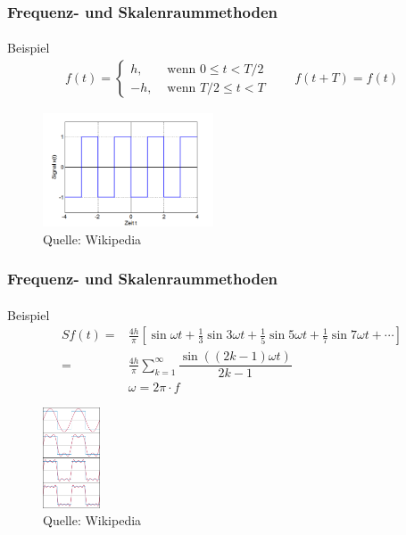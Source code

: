 \documentclass{beamer}
\begin{document}
\begin{frame}
    \frametitle{Frequenz- und Skalenraummethoden}
\framesubtitle{}

\begin{block}{Beispiel}
\begin{align*}
f(t) = \begin{cases} h, & \mbox{ wenn } 0\leq  t <T/2 \\ -h, & \mbox{ wenn } T/2 \leq t < T \end{cases}  \qquad f(t + T) = f(t)
\end{align*}
\end{block}
\begin{figure}[htp]
      \centering
    \includegraphics[width=0.45\textwidth]{img/rechteck}
      \caption{Quelle: Wikipedia}
\end{figure}

 \end{frame}

\begin{frame}
    \frametitle{Frequenz- und Skalenraummethoden}
\framesubtitle{}

\begin{block}{Beispiel}
\begin{align*}
Sf(t)=& \tfrac{4h}{\pi}\left[\sin \omega t+\tfrac{1}{3}\sin3 \omega t+\tfrac {1}{5}\sin5 \omega t+\tfrac{1}{7}\sin7 \omega t+ \cdots\right]\\
=& \tfrac{4h}{\pi} \sum_{k=1}^\infty \dfrac{ \sin\left( (2k-1)\omega t \right) }{2k-1} \\
& \omega = 2 \pi \cdot f
\end{align*}
\end{block}
\begin{figure}[htp]
      \centering
    \includegraphics[width=0.15\textwidth]{img/fourier_example}
      \caption{Quelle: Wikipedia}
\end{figure}

 \end{frame}
\end{document}
